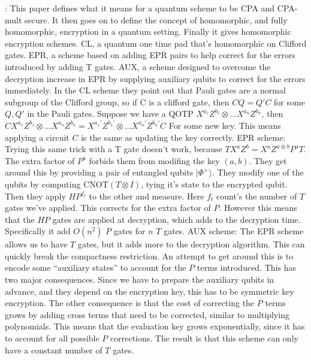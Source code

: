 \documentclass{article}
\newcommand{\ket}[1]{| #1 \rangle}
\begin{document}
\citet{broadbent2015}: This paper defines what it means for a quantum scheme to
be CPA and CPA-mult secure. It then goes on to define the concept of
homomorphic, and fully homomorphic, encryption in a quantum setting. Finally it
gives homomorphic encryption schemes. CL, a quantum one time pad that's
homomorphic on Clifford gates. EPR, a scheme based on adding EPR pairs to help
correct for the errors introduced by adding T gates. AUX, a scheme designed to
overcome the decryption increase in EPR by supplying auxiliary qubits to correct
for the errors immediately. In the CL scheme they point out that  Pauli gates
are a normal subgroup of the Clifford group, so if C is a clifford gate, then
$CQ = Q'C$ for some $Q,Q'$ in the Pauli gates. Suppose we have a QOTP
$X^{a_1}Z^{b_1}\otimes \ldots X^{a_n}Z^{b_n}$, then $C X^{a_1}Z^{b_1}\otimes
\ldots X^{a_n}Z^{b_n} = X^{a_1'}Z^{b_1'}\otimes \ldots X^{a_n'}Z^{b_n'}C$ For
some new key. This means applying a circuit $C$ is the same as updating the key
correctly. EPR scheme: Trying this same trick with a T gate doesn't work,
because $TX^aZ^b = X^aZ^{a\oplus b}P^aT$. The extra factor of $P^a$ forbids them
from modifing the key $(a,b)$. They get around this by providing a pair of
entangled qubits $\ket{\Phi^+}$. They modify one of the qubits by computing
$\text{CNOT}(T\otimes I)$, tying it's state to the encrypted qubit. Then they
apply $HP^{f_t}$ to the other and measure. Here $f_t$ count's the number of $T$
gates we've applied. This corrects for the extra factor of $P$. However this
means that the $HP$ gates are applied at decryption, which adds to the
decryption time. Specifically it add $O(n^2)$ $P$ gates for $n$ $T$ gates. AUX
scheme: The EPR scheme allows us to have $T$ gates, but it adds more to the
decryption algorithm. This can quickly break the compactness restriction. An
attempt to get around this is to encode some ``auxiliary states'' to account for
the $P$ terms introduced. This has two major consequences. Since we have to
prepare the auxiliary qubits in advance, and they depend on the encryption key,
this has to be symmetric key encryption. The other consequence is that the cost
of correcting the $P$ terms grows by adding cross terms that need to be
corrected, similar to multiplying polynomials. This means that the evaluation
key grows exponentially, since it has to account for all possible $P$
corrections. The result is that this scheme can only have a constant number of
$T$ gates.
\end{document}
